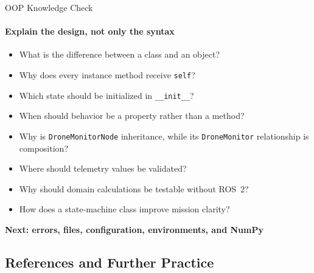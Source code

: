 \begin{frame}{OOP Knowledge Check}
\framesubtitle{Explain the design, not only the syntax}

\begin{itemize}
    \item What is the difference between a class and an object?
    \item Why does every instance method receive \texttt{self}?
    \item Which state should be initialized in \texttt{\_\_init\_\_}?
    \item When should behavior be a property rather than a method?
    \item Why is \texttt{DroneMonitorNode} inheritance, while its
          \texttt{DroneMonitor} relationship is composition?
    \item Where should telemetry values be validated?
    \item Why should domain calculations be testable without ROS~2?
    \item How does a state-machine class improve mission clarity?
\end{itemize}

\begin{center}
    \textbf{Next: errors, files, configuration, environments, and NumPy}
\end{center}
\end{frame}






















\subsection{References and Further Practice}

